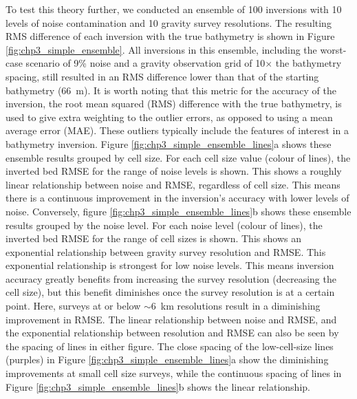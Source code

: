 To test this theory further, we conducted an ensemble of 100 inversions with 10 levels of noise contamination and 10 gravity survey resolutions. The resulting RMS difference of each inversion with the true bathymetry is shown in Figure \ref{fig:chp3_simple_ensemble}. All inversions in this ensemble, including the worst-case scenario of 9\% noise and a gravity observation grid of 10$\times$ the bathymetry spacing, still resulted in an RMS difference lower than that of the starting bathymetry (66~m). It is worth noting that this metric for the accuracy of the inversion, the root mean squared (RMS) difference with the true bathymetry, is used to give extra weighting to the outlier errors, as opposed to using a mean average error (MAE). These outliers typically include the features of interest in a bathymetry inversion. Figure \ref{fig:chp3_simple_ensemble_lines}a shows these ensemble results grouped by cell size. For each cell size value (colour of lines), the inverted bed RMSE for the range of noise levels is shown. This shows a roughly linear relationship between noise and RMSE, regardless of cell size. This means there is a continuous improvement in the inversion's accuracy with lower levels of noise. Conversely, figure \ref{fig:chp3_simple_ensemble_lines}b shows these ensemble results grouped by the noise level. For each noise level (colour of lines), the inverted bed RMSE for the range of cell sizes is shown. This shows an exponential relationship between gravity survey resolution and RMSE. This exponential relationship is strongest for low noise levels. This means inversion accuracy greatly benefits from increasing the survey resolution (decreasing the cell size), but this benefit diminishes once the survey resolution is at a certain point. Here, surveys at or below $\sim$6~km resolutions result in a diminishing improvement in RMSE. The linear relationship between noise and RMSE, and the exponential relationship between resolution and RMSE can also be seen by the spacing of lines in either figure. The close spacing of the low-cell-size lines (purples) in Figure \ref{fig:chp3_simple_ensemble_lines}a show the diminishing improvements at small cell size surveys, while the continuous spacing of lines in Figure \ref{fig:chp3_simple_ensemble_lines}b shows the linear relationship. \\

